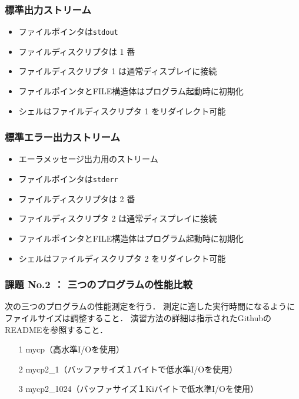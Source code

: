\documentclass{beamer}                 %
\begin{document}
\begin{frame}
  \frametitle{標準出力ストリーム}
  \begin{itemize}
  \item ファイルポインタは\texttt{stdout}
  \item ファイルディスクリプタは 1 番
  \item ファイルディスクリプタ 1 は通常ディスプレイに接続
  \item ファイルポインタとFILE構造体はプログラム起動時に初期化
  \item シェルはファイルディスクリプタ 1 をリダイレクト可能
  \end{itemize}
\end{frame}

\begin{frame}
  \frametitle{標準エラー出力ストリーム}
  \begin{itemize}
  \item エーラメッセージ出力用のストリーム
  \item ファイルポインタは\texttt{stderr}
  \item ファイルディスクリプタは 2 番
  \item ファイルディスクリプタ 2 は通常ディスプレイに接続
  \item ファイルポインタとFILE構造体はプログラム起動時に初期化
  \item シェルはファイルディスクリプタ 2 をリダイレクト可能
  \end{itemize}
\end{frame}

\begin{frame}[fragile]
  \frametitle{課題 No.2 ： 三つのプログラムの性能比較}
  
  次の三つのプログラムの性能測定を行う．
  測定に適した実行時間になるようにファイルサイズは調整すること．
  演習方法の詳細は指示されたGithubのREADMEを参照すること．

  \begin{enumerate}
  \item[1] mycp（高水準I/Oを使用）
  \item[2] mycp2\_1（バッファサイズ１バイトで低水準I/Oを使用）
  \item[3] mycp2\_1024（バッファサイズ１Kiバイトで低水準I/Oを使用）
  \end{enumerate}
\end{frame}
  
  
\end{document}

